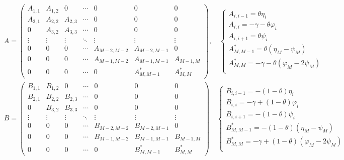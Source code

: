 \begin{align*}
    &\boxed{
        A = \begin{pmatrix}
            A_{1,1} & A_{1,2} & 0 & \cdots & 0 & 0 & 0 \\
            A_{2,1} & A_{2,2} & A_{2,3} & \cdots & 0 & 0 & 0 \\
            0 & A_{3,2} & A_{3,3} & \cdots & 0 & 0 & 0 \\
            \vdots & \vdots & \vdots & \ddots & \vdots & \vdots & \vdots \\
            0 & 0 & 0 & \cdots & A_{M-2,M-2} & A_{M-2,M-1} & 0 \\
            0 & 0 & 0 & \cdots & A_{M-1,M-2} & A_{M-1,M-1} & A_{M-1,M} \\
            0 & 0 & 0 & \cdots & 0  & A_{M,M-1}^* & A_{M,M}^*
        \end{pmatrix},
        \quad \begin{cases}
            A_{i,i-1} = \theta\eta_i \\
            A_{i,i} = -\gamma - \theta \varphi_i \\
            A_{i,i+1} = \theta\psi_i \\
            A_{M,M-1}^* = \theta(\eta_M - \psi_M)\\
            A_{M,M}^* = -\gamma - \theta (\varphi_M - 2\psi_M)\\
        \end{cases}
    } \\
    & \boxed{
        B = \begin{pmatrix}
            B_{1,1} & B_{1,2} & 0 & \cdots & 0 & 0 & 0 \\
            B_{2,1} & B_{2,2} & B_{2,3} & \cdots & 0 & 0 & 0 \\
            0 & B_{3,2} & B_{3,3} & \cdots & 0 & 0 & 0 \\
            \vdots & \vdots & \vdots & \ddots & \vdots & \vdots & \vdots \\
            0 & 0 & 0 & \cdots & B_{M-2,M-2} & B_{M-2,M-1} & 0 \\
            0 & 0 & 0 & \cdots & B_{M-1,M-2} & B_{M-1,M-1} & B_{M-1,M} \\
            0 & 0 & 0 & \cdots & 0  & B_{M,M-1}^* & B_{M,M}^*
        \end{pmatrix}
        \quad \begin{cases}
            B_{i,i-1} = -(1-\theta)\eta_i\\
            B_{i,i} = -\gamma + (1-\theta) \varphi_i\\
            B_{i,i+1} = -(1-\theta)\psi_i\\
            B_{M,M-1}^* = -(1-\theta)(\eta_M - \psi_M)\\
            B_{M,M}^* = -\gamma + (1-\theta) (\varphi_M - 2\psi_M)\\
        \end{cases}
    }
\end{align*}
